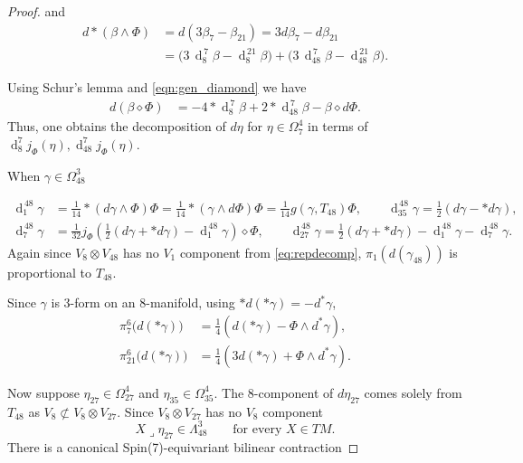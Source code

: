 \documentclass[10pt,a4paper,reqno]{article}
\theoremstyle{definition}
\numberwithin{equation}{section}
\DeclareMathOperator{\dd}{d}
\begin{document}
\begin{proof}
and
\begin{align*}
d*(\beta\wedge\Phi)
 &= d(3\beta_7 - \beta_{21}) = 3 d\beta_7 - d\beta_{21}\\
 &= \big(3\,\dd_8^{\,7}\beta - \dd_8^{\,21}\beta\big)
  + \big(3\,\dd_{48}^{\,7}\beta - \dd_{48}^{\,21}\beta\big).
\end{align*}

Using Schur's lemma and \cref{eqn:gen_diamond} we have 
\begin{align*}
    d(\beta \diamond \Phi)& = -4 *\dd_8^{\,7}\beta  + 2 *\dd_{48}^{\,7}\beta  -\beta \diamond d\Phi.
\end{align*} 
Thus, one obtains the decomposition of $d\eta$ for $\eta\in\Omega^4_7$ in terms of $\dd^7_8j_\Phi(\eta), \dd^7_{48}j_\Phi(\eta)$. 

\medskip

When $\gamma \in \Omega^3_{48}$

\begin{align*}
    \dd_1^{\,48}\gamma &= \frac{1}{14}*(d\gamma\wedge\Phi)\Phi = \frac{1}{14}*(\gamma \wedge d\Phi)\Phi=\frac{1}{14} g(\gamma ,T_{48}) \Phi, 
\qquad
\dd_{35}^{\,48}\gamma = \frac12(d \gamma - * d \gamma), \\
\dd_7^{\,48}\gamma &= \frac{1}{32} j_\Phi\left(\frac{1}{2}(d\gamma+* d\gamma) -  \dd_1^{\,48}\gamma \right)\diamond \Phi, \qquad \dd_{27}^{\,48}\gamma = \frac{1}{2}(d\gamma +* d\gamma) - \dd_1^{\,48}\gamma-\dd_7^{\,48}\gamma.
\end{align*}
Again since $V_8\otimes V_{48}$ has no $V_1$ component from \cref{eq:repdecomp}, $\pi_1(d(\gamma_{48}))$ is proportional to $T_{48}$. 

\medskip

Since $\gamma$ is $3$-form on an $8$-manifold, using $*d(*\gamma)=-d^*\gamma$, 
\begin{align*}
    \pi^6_7\big(d(*\gamma)\big) &=\frac14\left(d(*\gamma)-\Phi\wedge d^*\gamma\right), \\
    \pi^6_{21}\big(d(*\gamma)\big)&=\frac14\left(3d(*\gamma)+\Phi\wedge d^*\gamma\right).
\end{align*}

\medskip

Now suppose $\eta_{27}\in \Omega^4_{27}$ and $\eta_{35}\in\Omega^4_{35}$. The 8-component of $d\eta_{27}$ comes solely from $T_{48}$ as $V_8 \not\subset V_8\otimes V_{27}$. Since $V_8\otimes V_{27}$ has no $V_8$ component 
$$
X\lrcorner\eta_{27}\in\Lambda^3_{48}
\qquad\text{for every }X\in TM.
$$
There is a canonical Spin(7)-equivariant bilinear contraction


\end{proof}
\end{document}

